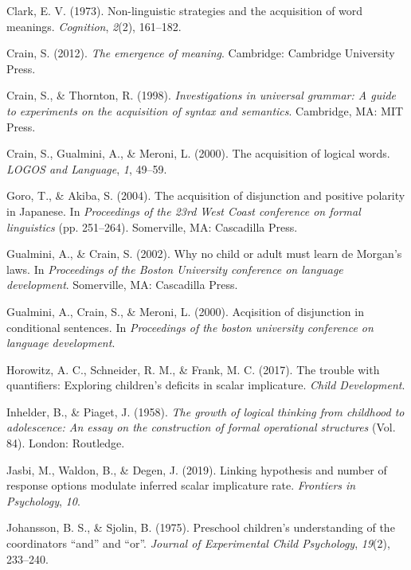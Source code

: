 \documentclass[floatsintext,man]{apa6}
\theoremstyle{definition}
\theoremstyle{definition}
\theoremstyle{definition}
\theoremstyle{remark}
\begin{document}
\hypertarget{ref-clark1973non}{}
Clark, E. V. (1973). Non-linguistic strategies and the acquisition of
word meanings. \emph{Cognition}, \emph{2}(2), 161--182.

\hypertarget{ref-crain2012emergence}{}
Crain, S. (2012). \emph{The emergence of meaning}. Cambridge: Cambridge
University Press.

\hypertarget{ref-crain1998investigations}{}
Crain, S., \& Thornton, R. (1998). \emph{Investigations in universal
grammar: A guide to experiments on the acquisition of syntax and
semantics}. Cambridge, MA: MIT Press.

\hypertarget{ref-crain2000acquisition}{}
Crain, S., Gualmini, A., \& Meroni, L. (2000). The acquisition of
logical words. \emph{LOGOS and Language}, \emph{1}, 49--59.

\hypertarget{ref-goro2004acquisition}{}
Goro, T., \& Akiba, S. (2004). The acquisition of disjunction and
positive polarity in Japanese. In \emph{Proceedings of the 23rd West
Coast conference on formal linguistics} (pp. 251--264). Somerville, MA:
Cascadilla Press.

\hypertarget{ref-gualminicrain2002}{}
Gualmini, A., \& Crain, S. (2002). Why no child or adult must learn de
Morgan's laws. In \emph{Proceedings of the Boston University conference
on language development}. Somerville, MA: Cascadilla Press.

\hypertarget{ref-gualmini2000}{}
Gualmini, A., Crain, S., \& Meroni, L. (2000). Acqisition of disjunction
in conditional sentences. In \emph{Proceedings of the boston university
conference on language development}.

\hypertarget{ref-horowitz2017trouble}{}
Horowitz, A. C., Schneider, R. M., \& Frank, M. C. (2017). The trouble
with quantifiers: Exploring children's deficits in scalar implicature.
\emph{Child Development}.

\hypertarget{ref-piaget1958growth}{}
Inhelder, B., \& Piaget, J. (1958). \emph{The growth of logical thinking
from childhood to adolescence: An essay on the construction of formal
operational structures} (Vol. 84). London: Routledge.

\hypertarget{ref-jasbi2019linking}{}
Jasbi, M., Waldon, B., \& Degen, J. (2019). Linking hypothesis and
number of response options modulate inferred scalar implicature rate.
\emph{Frontiers in Psychology}, \emph{10}.

\hypertarget{ref-johansson1975preschool}{}
Johansson, B. S., \& Sjolin, B. (1975). Preschool children's
understanding of the coordinators ``and'' and ``or''. \emph{Journal of
Experimental Child Psychology}, \emph{19}(2), 233--240.
\end{document}
